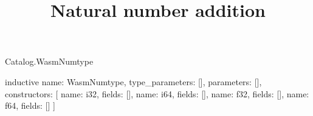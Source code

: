 \begin{lexlean}{Catalog.WasmNumtype}
\title{Natural number addition}
\begin{semanticmodule}
inductive{
  name: WasmNumtype,
  type_parameters: [],
  parameters: [],
  constructors: [
    {name: i32, fields: []},
    {name: i64, fields: []},
    {name: f32, fields: []},
    {name: f64, fields: []}
  ]
}
\end{semanticmodule}
\end{lexlean}
